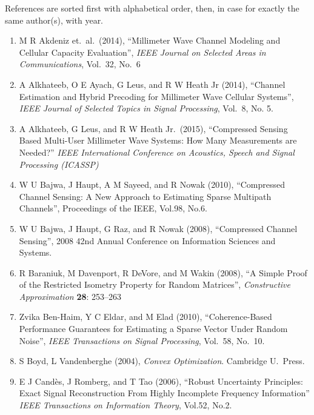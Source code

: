 \documentclass[12pt]{article}
\begin{document}
References are sorted first with alphabetical order, then, in case for exactly the same author(s), with year.

\begin{enumerate}

\item M R Akdeniz et.\ al.\ (2014), ``Millimeter Wave Channel Modeling and Cellular Capacity Evaluation'', \textit{IEEE Journal on Selected Areas in Communications}, Vol.\ 32, No.\ 6

\item A Alkhateeb, O E Ayach, G Leus, and R W Heath Jr (2014), ``Channel Estimation and Hybrid Precoding for Millimeter Wave Cellular Systems'', \textit{IEEE Journal of Selected Topics in Signal Processing}, Vol.\ 8, No. 5.

\item A Alkhateeb, G Leus, and R W Heath Jr.\ (2015), ``Compressed Sensing Based Multi-User Millimeter Wave Systems: How Many Measurements are Needed?'' \textit{IEEE International Conference on Acoustics, Speech and Signal Processing (ICASSP)}

\item W U Bajwa, J Haupt, A M Sayeed, and R Nowak (2010), ``Compressed Channel Sensing: A New Approach to Estimating Sparse Multipath Channels'', Proceedings of the IEEE, Vol.98, No.6.

\item W U Bajwa, J Haupt, G Raz, and R Nowak (2008), ``Compressed Channel Sensing'', 2008 42nd Annual Conference on Information Sciences and Systems.

\item R Baraniuk, M Davenport, R DeVore, and M Wakin (2008), ``A Simple Proof of the Restricted Isometry Property for Random Matrices'', \textit{Constructive Approximation} \textbf{28}: 253–263

\item Zvika Ben-Haim, Y C Eldar, and M Elad (2010), ``Coherence-Based Performance Guarantees for Estimating a Sparse Vector Under Random Noise'', \textit{IEEE Transactions on Signal Processing}, Vol.\ 58, No.\ 10.

\item S Boyd, L Vandenberghe (2004), \textit{Convex Optimization}. Cambridge U.\ Press.

\item E J Cand\`es, J Romberg, and T Tao (2006), ``Robust Uncertainty Principles: Exact Signal Reconstruction From Highly Incomplete Frequency Information'' \textit{IEEE Transactions on Information Theory}, Vol.52, No.2.


\end{enumerate}
\end{document}
